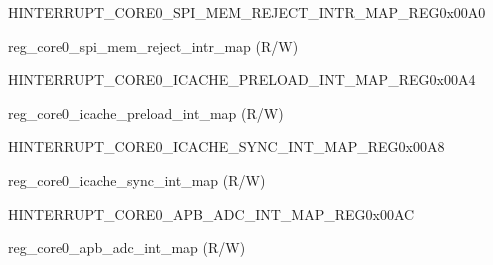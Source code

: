 \begin{register}{H}{INTERRUPT\_CORE0\_SPI\_MEM\_REJECT\_INTR\_MAP\_REG}{0x00A0}\label{regdesc:INTERRUPTCORE0SPIMEMREJECTINTRMAPREG}
%
%
\regnewline%
\begin{regdesc}\begin{reglist}
\label{fielddesc:INTERRUPTCORE0SPIMEMREJECTINTRMAP}\item [INTERRUPT\_CORE0\_SPI\_MEM\_REJECT\_INTR\_MAP] reg\_core0\_spi\_mem\_reject\_intr\_map (R/W)
\end{reglist}\end{regdesc}
\end{register}


\begin{register}{H}{INTERRUPT\_CORE0\_ICACHE\_PRELOAD\_INT\_MAP\_REG}{0x00A4}\label{regdesc:INTERRUPTCORE0ICACHEPRELOADINTMAPREG}
%
%
\regnewline%
\begin{regdesc}\begin{reglist}
\label{fielddesc:INTERRUPTCORE0ICACHEPRELOADINTMAP}\item [INTERRUPT\_CORE0\_ICACHE\_PRELOAD\_INT\_MAP] reg\_core0\_icache\_preload\_int\_map (R/W)
\end{reglist}\end{regdesc}
\end{register}


\begin{register}{H}{INTERRUPT\_CORE0\_ICACHE\_SYNC\_INT\_MAP\_REG}{0x00A8}\label{regdesc:INTERRUPTCORE0ICACHESYNCINTMAPREG}
%
%
\regnewline%
\begin{regdesc}\begin{reglist}
\label{fielddesc:INTERRUPTCORE0ICACHESYNCINTMAP}\item [INTERRUPT\_CORE0\_ICACHE\_SYNC\_INT\_MAP] reg\_core0\_icache\_sync\_int\_map (R/W)
\end{reglist}\end{regdesc}
\end{register}


\begin{register}{H}{INTERRUPT\_CORE0\_APB\_ADC\_INT\_MAP\_REG}{0x00AC}\label{regdesc:INTERRUPTCORE0APBADCINTMAPREG}
%
%
\regnewline%
\begin{regdesc}\begin{reglist}
\label{fielddesc:INTERRUPTCORE0APBADCINTMAP}\item [INTERRUPT\_CORE0\_APB\_ADC\_INT\_MAP] reg\_core0\_apb\_adc\_int\_map (R/W)
\end{reglist}\end{regdesc}
\end{register}


